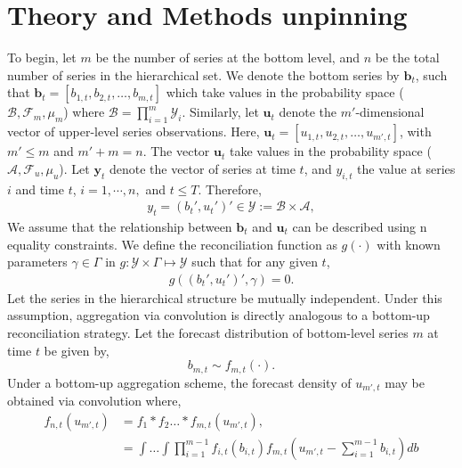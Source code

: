 \section{\texorpdfstring{Theory and Methods unpinning }{Theory and Methods unpinning }}\label{theory-and-methods-unpinning}

To begin, let \(m\) be the number of series at the bottom level, and \(n\) be the total number of series in the hierarchical set. We denote the bottom series by \(\boldsymbol{b}_t\), such that \(\boldsymbol{b}_t = [b_{1,t}, b_{2,t}, \dots, b_{m,t}]\) which take values in the probability space (\(\mathcal{B}, \mathcal{F}_{m}, \mu_{m}\)) where \(\mathcal{B} = \prod_{i=1}^{m} \mathcal{Y}_{i}\). Similarly, let \(\boldsymbol{u}_t\) denote the \(m'\)-dimensional vector of upper-level series observations. Here, \(\boldsymbol{u}_{t} = [u_{1,t}, u_{2,t}, \dots, u_{m',t}]\), with \(m' \leq m\) and \(m' + m = n\). The vector \(\boldsymbol{u}_{t}\) take values in the probability space (\(\mathcal{A}, \mathcal{F}_{u}, \mu_{u}\)). Let \(\boldsymbol{y}_{t}\) denote the vector of series at time \(t\), and \(y_{i,t}\) the value at series \(i\) and time \(t\), \(i = 1,\cdots,n,\) and \(t \leq T\). Therefore,
\begin{align}
    y_{t} = (b_t',  u_t')' \in \mathcal{Y}:= \mathcal{B} \times \mathcal{A},
\end{align}
We assume that the relationship between \(\boldsymbol{b}_t\) and \(\boldsymbol{u}_t\) can be described using n equality constraints. We define the reconciliation function as \(g(\cdot)\) with known parameters \(\gamma \in \Gamma\) in \(g: \mathcal{Y} \times \Gamma \mapsto \mathcal{Y}\) such that for any given \(t\),
\begin{align}
    g( (b_t',  u_t')', \gamma) = 0.
\end{align}
Let the series in the hierarchical structure be mutually independent. Under this assumption, aggregation via convolution is directly analogous to a bottom-up reconciliation strategy. Let the forecast distribution of bottom-level series \(m\) at time \(t\) be given by,
\begin{equation*}
    b_{m,t} \sim f_{m,t}(\cdot).
\end{equation*}
Under a bottom-up aggregation scheme, the forecast density of \(u_{m', t}\) may be obtained via convolution where,
\begin{align}
    \label{eqn_contconv}
    f_{n, t}(u_{m', t}) & = f_{1}*f_{2}\dots * f_{m,t}(u_{m', t}), \\ \nonumber
    &= \int \dots \int \prod_{i=1}^{m-1}f_{i,t}(b_{i,t})f_{m,t}(u_{m', t} - \sum_{i=1}^{m-1}b_{i,t})db
\end{align}
